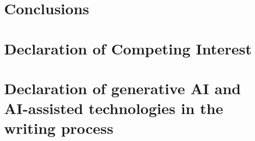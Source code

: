\begin{linenumbers}
\section{Conclusions}
\label{sec:Conclusion}



\section{Declaration of Competing Interest}
\label{sec:DeclarationInterest}



\section{Declaration of generative AI and AI-assisted technologies in the writing process}
\label{sec:Declaration AI}


\end{linenumbers}
